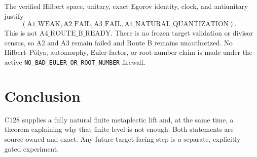 \documentclass[11pt]{article}
\begin{document}
The verified Hilbert space, unitary, exact Egorov identity, clock, and
antiunitary justify
\[
 (\mathrm{A1\_WEAK},\mathrm{A2\_FAIL},\mathrm{A3\_FAIL},
  \mathrm{A4\_NATURAL\_QUANTIZATION}).
\]
This is not $\mathrm{A4\_ROUTE\_B\_READY}$.  There is no frozen target
validation or divisor census, so A2 and A3 remain failed and Route B remains
unauthorized.  No Hilbert--P\'olya, automorphy, Euler-factor, or root-number
claim is made under the active
\texttt{NO\_BAD\_EULER\_OR\_ROOT\_NUMBER} firewall.

\section{Conclusion}

C128 supplies a fully natural finite metaplectic lift and, at the same time,
a theorem explaining why that finite level is not enough.  Both statements
are source-owned and exact.  Any future target-facing step is a separate,
explicitly gated experiment.
\end{document}
